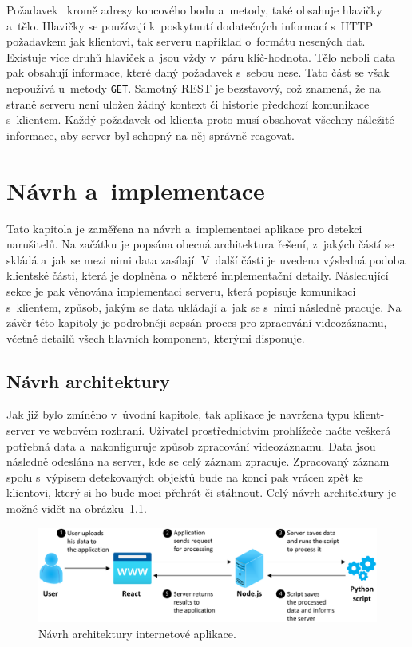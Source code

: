 Požadavek~\cite{website:REST} kromě adresy koncového bodu a~metody, také obsahuje hlavičky a~tělo. Hlavičky se používají k~poskytnutí dodatečných informací s~HTTP požadavkem jak klientovi, tak serveru například o~formátu nesených dat. Existuje více druhů hlaviček a~jsou vždy v~páru klíč-hodnota. Tělo neboli data pak obsahují informace, které daný požadavek s~sebou nese. Tato část se však nepoužívá u~metody \texttt{GET}. Samotný REST je bezstavový, což znamená, že na straně serveru není uložen žádný kontext či historie předchozí komunikace s~klientem. Každý požadavek od klienta proto musí obsahovat všechny náležité informace, aby server byl schopný na něj správně reagovat.


\chapter{Návrh a~implementace}
\label{kap:implementace}
Tato kapitola je zaměřena na návrh a~implementaci aplikace pro detekci narušitelů. Na začátku je popsána obecná architektura řešení, z~jakých částí se skládá a~jak se mezi nimi data zasílají. V~další části je uvedena výsledná podoba klientské části, která je doplněna o~některé implementační detaily. Následující sekce je pak věnována implementaci serveru, která popisuje komunikaci s~klientem, způsob, jakým se data ukládají a~jak se s~nimi následně pracuje. Na závěr této kapitoly je podrobněji sepsán proces pro zpracování videozáznamu, včetně detailů všech hlavních komponent, kterými disponuje.

\section{Návrh architektury}
Jak již bylo zmíněno v~úvodní kapitole, tak aplikace je navržena typu klient-server ve webovém rozhraní. Uživatel prostřednictvím prohlížeče načte veškerá potřebná data a~nakonfiguruje způsob zpracování videozáznamu. Data jsou následně odeslána na server, kde se celý záznam zpracuje. Zpracovaný záznam spolu s~výpisem detekovaných objektů bude na konci pak vrácen zpět ke klientovi, který si ho bude moci přehrát či stáhnout. Celý návrh architektury je možné vidět na obrázku~\ref{img:navrh}.

\begin{figure}[hbt]
	\centering
	\setlength{\fboxsep}{0pt}
	\includegraphics[width=1.0\textwidth]{obrazky-figures/navrh.pdf}
	\caption{Návrh architektury internetové aplikace.}
	\label{img:navrh}
\end{figure}

